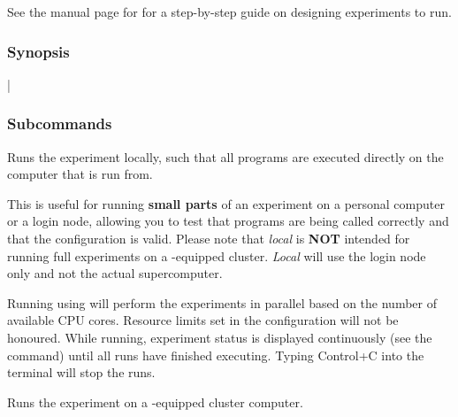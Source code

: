 \documentclass[a4paper,english]{article}
\begin{document}
\begin{adjustwidth}{18pt}{0pt}
                See the manual page for  for a step-by-step guide on
                designing experiments to run.


            \subsubsection{Synopsis}
                |

            \subsubsection{Subcommands}
                \begin{Description}[Subcommands]
                    \item[\Arg{local}]
                        Runs the experiment locally, such that all programs are executed directly on the computer
                        that  is run from.

                        This is useful for running \textbf{small parts} of an experiment on
                        a personal computer or a login node, allowing you to test that programs
                        are being called correctly and that the configuration is valid.
                        Please note that \emph{local} is \textbf{NOT} intended for running full
                        experiments on a -equipped cluster.
                        \emph{Local} will use the login node only and not the actual
                        supercomputer.

                        Running using   will perform the experiments in
                        parallel based on the number of available CPU cores.
                        Resource limits set in the configuration will not be honoured.
                        While running, experiment status is displayed continuously (see the
                          command) until all runs have finished executing.
                        Typing Control+C into the terminal will stop the runs.

                    \item[\Arg{slurm}]
                        Runs the experiment on a -equipped cluster computer.


\end{Description}
\end{adjustwidth}
\end{document}
